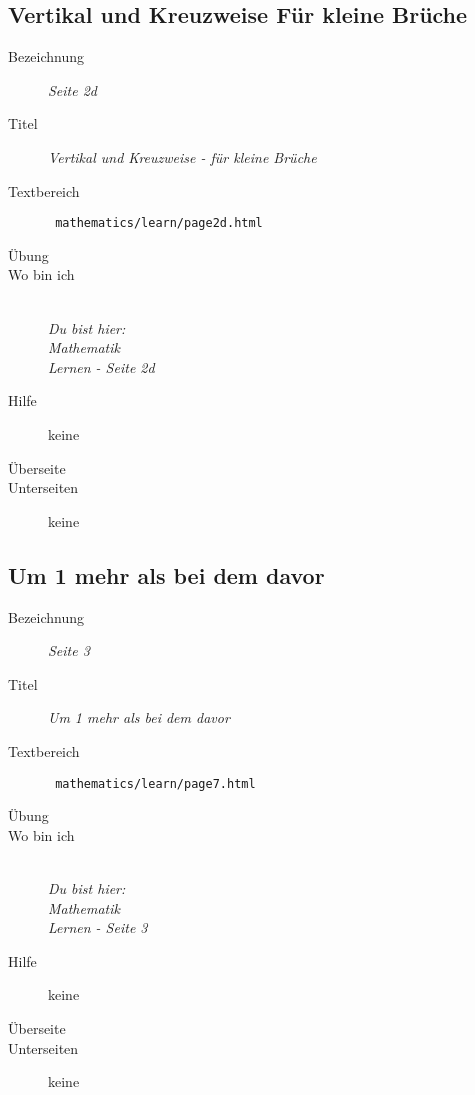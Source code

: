 \subsection{ Vertikal und Kreuzweise Für kleine Brüche }
\label{cha:math-learn-page2d}
\begin{description}
  \item[Bezeichnung] \emph{ Seite 2d }
  \item[Titel] \emph{ Vertikal und Kreuzweise - für kleine Brüche }
  \item[Textbereich] \texttt{ mathematics/learn/page2d.html }
  \item[Übung] 
  \item[Wo bin ich] \emph{\\Du bist hier:\\Mathematik\\Lernen - Seite 2d}
  \item[Hilfe] keine
  \item[Überseite] 
  \item[Unterseiten] keine
\end{description}


\subsection{ Um 1 mehr als bei dem davor }
\label{cha:math-learn-page3}
\begin{description}
  \item[Bezeichnung] \emph{ Seite 3 }
  \item[Titel] \emph{ Um 1 mehr als bei dem davor }
  \item[Textbereich] \texttt{ mathematics/learn/page7.html }
  \item[Übung] 
  \item[Wo bin ich] \emph{\\Du bist hier:\\Mathematik\\Lernen - Seite 3 }
  \item[Hilfe] keine
  \item[Überseite] 
  \item[Unterseiten] keine
\end{description}



